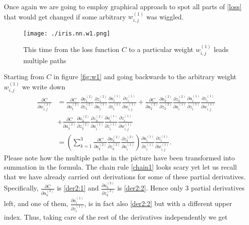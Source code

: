 \documentclass[a4paper,12pt,notitlepage]{article}
\begin{document}
Once again we are going to employ graphical approach to spot all parts of \eqref{loss} that would get changed if some arbitrary $w_{i,j}^{(1)}$ was wiggled.
\begin{figure}[H]
    \centering
    \texttt{[image: ./iris.nn.w1.png]}
    \caption{This time from the loss function ${C}$ to a particular weight ${w_{i,j}^{(1)}}$ leads multiple paths}
    \label{fig:w1}
\end{figure}
Starting from $C$ in figure \eqref{fig:w1} and going backwards to the arbitrary weight $w_{i,j}^{(1)}$ we write down
\begin{equation} \label{chain1}
\begin{split}
\frac{\partial C}{\partial w_{i,j}^{(1)}}
&=\frac{\partial C}{\partial a_{1}^{(2)}}\frac{\partial a_{1}^{(2)}}{\partial z_{1}^{(2)}}\frac{\partial z_{1}^{(2)}}{\partial a_{i}^{(1)}}\frac{\partial a_{i}^{(1)}}{\partial z_{i}^{(1)}}\frac{\partial z_{i}^{(1)}}{\partial w_{i,j}^{(1)}}
+\frac{\partial C}{\partial a_{2}^{(2)}}\frac{\partial a_{2}^{(2)}}{\partial z_{2}^{(2)}}\frac{\partial z_{2}^{(2)}}{\partial a_{i}^{(1)}}\frac{\partial a_{i}^{(1)}}{\partial z_{i}^{(1)}}\frac{\partial z_{i}^{(1)}}{\partial w_{i,j}^{(1)}}\\
&+\frac{\partial C}{\partial a_{3}^{(2)}}\frac{\partial a_{3}^{(2)}}{\partial z_{3}^{(2)}}\frac{\partial z_{3}^{(2)}}{\partial a_{i}^{(1)}}\frac{\partial a_{i}^{(1)}}{\partial z_{i}^{(1)}}\frac{\partial z_{i}^{(1)}}{\partial w_{i,j}^{(1)}}\\
&=\left( \sum_{k=1}^{3}\frac{\partial C}{\partial a_{k}^{(2)}}\frac{\partial a_{k}^{(2)}}{\partial z_{k}^{(2)}}\frac{\partial z_{k}^{(2)}}{\partial a_{i}^{(1)}}\right )\frac{\partial a_{i}^{(1)}}{\partial z_{i}^{(1)}}\frac{\partial z_{i}^{(1)}}{\partial w_{i,j}^{(1)}}.
\end{split}
\end{equation}
Please note how the multiple paths in the picture have been transformed into summation in the formula. The chain rule \eqref{chain1} looks scary yet let us recall that we have already carried out derivations for some of these partial derivatives. Specifically, $\frac{\partial C}{\partial a_{k}^{(2)}}$ is \eqref{der2:1} and $\frac{\partial a_{k}^{(2)}}{\partial z_{k}^{(2)}}$ is \eqref{der2:2}. Hence only 3 partial derivatives left, and one of them, $\frac{\partial a_{i}^{(1)}}{\partial z_{i}^{(1)}}$, is in fact also \eqref{der2:2} but with a different upper index. Thus, taking care of the rest of the derivatives independently we get
\end{document}
